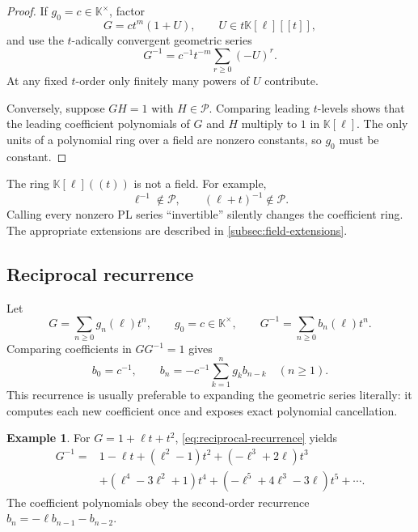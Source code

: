 \documentclass[11pt,oneside]{article}
\numberwithin{equation}{section}
\theoremstyle{definition}
\newtheorem{example}[theorem]{Example}
\newcommand{\K}{\mathbb K}
\newcommand{\PL}{\mathscr P}
\begin{document}
\begin{proof}
If \(g_0=c\in\K^\times\), factor
\[
  G=c t^m(1+U),\qquad U\in t\K[\ell][[t]],
\]
and use the \(t\)-adically convergent geometric series
\begin{equation}\label{eq:geometric-reciprocal}
  G^{-1}=c^{-1}t^{-m}\sum_{r\ge0}(-U)^r.
\end{equation}
At any fixed \(t\)-order only finitely many powers of \(U\) contribute.

Conversely, suppose \(GH=1\) with \(H\in\PL\).  Comparing leading
\(t\)-levels shows that the leading coefficient polynomials of \(G\) and \(H\)
multiply to \(1\) in \(\K[\ell]\).  The only units of a polynomial ring over a
field are nonzero constants, so \(g_0\) must be constant.
\end{proof}

\begin{warningbox}
The ring \(\K[\ell]((t))\) is not a field.  For example,
\[
  \ell^{-1}\notin\PL,
  \qquad
  (\ell+t)^{-1}\notin\PL.
\]
Calling every nonzero PL series ``invertible'' silently changes the coefficient
ring.  The appropriate extensions are described in
\cref{subsec:field-extensions}.
\end{warningbox}

\subsection{Reciprocal recurrence}

Let
\[
  G=\sum_{n\ge0}g_n(\ell)t^n,
  \qquad g_0=c\in\K^\times,
  \qquad
  G^{-1}=\sum_{n\ge0}b_n(\ell)t^n.
\]
Comparing coefficients in \(GG^{-1}=1\) gives
\begin{equation}\label{eq:reciprocal-recurrence}
  b_0=c^{-1},
  \qquad
  b_n=-c^{-1}\sum_{k=1}^{n}g_kb_{n-k}
  \quad(n\ge1).
\end{equation}
This recurrence is usually preferable to expanding the geometric series
literally: it computes each new coefficient once and exposes exact polynomial
cancellation.

\begin{example}
For \(G=1+\ell t+t^2\), \eqref{eq:reciprocal-recurrence} yields
\begin{align*}
 G^{-1}={}&1-\ell t+(\ell^2-1)t^2+(-\ell^3+2\ell)t^3\\
 &+(\ell^4-3\ell^2+1)t^4
 +(-\ell^5+4\ell^3-3\ell)t^5+\cdots.
\end{align*}
The coefficient polynomials obey the second-order recurrence
\(b_n=-\ell b_{n-1}-b_{n-2}\).
\end{example}
\end{document}
